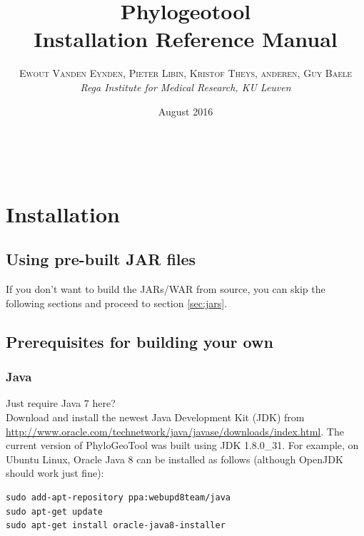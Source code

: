 \documentclass[a4paper, 11pt]{article} %
\title{\textbf{Phylogeotool}\\ %
Installation Reference Manual} %
\author{\textsc{Ewout Vanden Eynden, Pieter Libin, Kristof Theys, anderen, Guy Baele} %
\\{\textit{Rega Institute for Medical Research, KU Leuven}}} %
\date{August 2016} %
\makeatletter
\renewcommand{\maketitle}{ %
\begin{flushright} %
{\LARGE\@title} %

\vspace{50pt} %

{\large\@author} %
\\\@date %

\vspace{40pt} %
\end{flushright}
}
\makeatother
\begin{document}
\maketitle %

\vspace{30pt} %

\tableofcontents
\newpage

\section{Installation}

\subsection{Using pre-built JAR files}
If you don't want to build the JARs/WAR from source, you can skip the following sections and proceed to section \ref{sec:jars}.


\subsection{Prerequisites for building your own}

\subsubsection*{Java}
Just require Java 7 here?\\

Download and install the newest Java Development Kit (JDK) from \url{http://www.oracle.com/technetwork/java/javase/downloads/index.html}.
The current version of PhyloGeoTool was built using JDK 1.8.0\_31.
For example, on Ubuntu Linux, Oracle Java 8 can be installed as follows (although OpenJDK should work just fine):
\begin{verbatim} 
sudo add-apt-repository ppa:webupd8team/java
sudo apt-get update
sudo apt-get install oracle-java8-installer
\end{verbatim}
\end{document}
